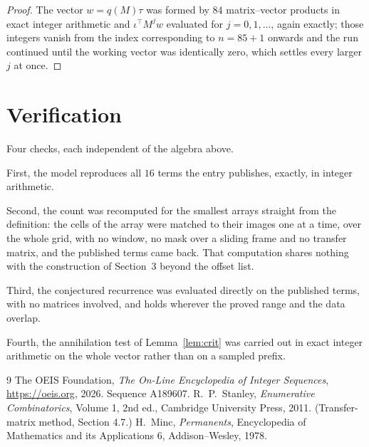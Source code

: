 \documentclass[11pt,a4paper]{article}
\theoremstyle{plain}
\theoremstyle{definition}
\begin{document}
\begin{proof}
The vector $w=q(M)\tau$ was formed by $84$ matrix--vector products in exact integer
arithmetic and $\iota^{\!\top}M^{j}w$ evaluated for $j=0,1,\dots$, again exactly; those
integers vanish from the index corresponding to $n=85+1$ onwards and the run continued
until the working vector was identically zero, which settles every larger $j$ at once.
\end{proof}

\section{Verification}

Four checks, each independent of the algebra above.

First, the model reproduces all $16$ terms the entry publishes, exactly, in integer
arithmetic.

Second, the count was recomputed for the smallest arrays straight from the definition: the
cells of the array were matched to their images one at a time, over the whole grid, with no
window, no mask over a sliding frame and no transfer matrix, and the published terms came back.
That computation shares nothing with the construction of Section~3 beyond the offset list.

Third, the conjectured recurrence was evaluated directly on the published terms, with no
matrices involved, and holds wherever the proved range and the data overlap.

Fourth, the annihilation test of Lemma~\ref{lem:crit} was carried out in exact integer
arithmetic on the whole vector rather than on a sampled prefix.

\begin{thebibliography}{9}
 The OEIS Foundation, \emph{The On-Line Encyclopedia of Integer
Sequences}, \url{https://oeis.org}, 2026. Sequence A189607.
 R.~P.~Stanley, \emph{Enumerative Combinatorics}, Volume 1, 2nd ed.,
Cambridge University Press, 2011. (Transfer-matrix method, Section 4.7.)
 H.~Minc, \emph{Permanents}, Encyclopedia of Mathematics and its
Applications 6, Addison--Wesley, 1978.
\end{thebibliography}
\end{document}
